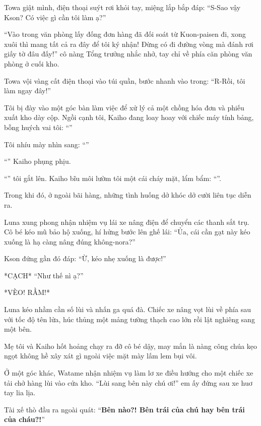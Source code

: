 \documentclass[../main.tex]{subfiles}
\begin{document}
Towa giật mình, điện thoại suýt rơi khỏi tay, miệng lắp bắp đáp: ``S-Sao vậy Kson? Có việc gì cần tôi làm ạ?''

``Vào trong văn phòng lấy đống đơn hàng đã đối soát từ Kuon-paisen đi, xong xuôi thì mang tất cả ra đây để tôi ký nhận! Đừng có đi đường vòng mà đánh rơi giấy tờ đâu đấy!'' cô nàng Tổng trưởng nhắc nhở, tay chỉ về phía căn phòng văn phòng ở cuối kho.

Towa vội vàng cất điện thoại vào túi quần, bước nhanh vào trong: ``R-Rồi, tôi làm ngay đây!''

Tôi bị đày vào một góc bàn làm việc để xử lý cả một chồng hóa đơn và phiếu xuất kho dày cộp. Ngồi cạnh tôi, Kaiho đang loay hoay với chiếc máy tính bảng, bỗng huých vai tôi: ``''

Tôi nhíu mày nhìn sang: ``''

``'' Kaiho phụng phịu.

``'' tôi gắt lên. Kaiho bĩu môi lườm tôi một cái cháy mặt, lẩm bẩm: ``''.

Trong khi đó, ở ngoài bãi hàng, những tình huống dở khóc dở cười liên tục diễn ra.

Luna xung phong nhận nhiệm vụ lái xe nâng điện để chuyển các thanh sắt trụ. Cô bé kéo mũ bảo hộ xuống, hí hửng bước lên ghế lái: ``Ủa, cái cần gạt này kéo xuống là hạ càng nâng đúng không-nora?''

Kson đứng gần đó đáp: ``Ừ, kéo nhẹ xuống là được!''

*CẠCH* ``Như thế nì ạ?''

*VÈO! RẦM!*

Luna kéo nhầm cần số lùi và nhấn ga quá đà. Chiếc xe nâng vọt lùi về phía sau với tốc độ tên lửa, húc thủng một mảng tường thạch cao lớn rồi lật nghiêng sang một bên.

Mẹ tôi và Kaiho hốt hoảng chạy ra đỡ cô bé dậy, may mắn là nàng công chúa kẹo ngọt không hề xây xát gì ngoài việc mặt mày lấm lem bụi vôi.

Ở một góc khác, Watame nhận nhiệm vụ làm lơ xe điều hướng cho một chiếc xe tải chở hàng lùi vào cửa kho. ``Lùi sang bên này chú ơi!'' em ấy đứng sau xe huơ tay lia lịa.

Tài xế thò đầu ra ngoài quát: ``\textbf{Bên nào?! Bên trái của chú hay bên trái của cháu?!}''
\end{document}
